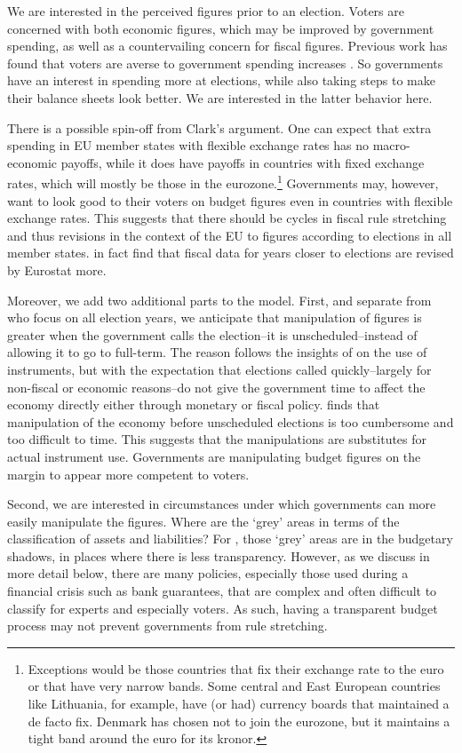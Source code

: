 \documentclass[]{article}
\begin{document}
We are interested in the perceived figures prior to an election. Voters are concerned with both economic figures, which may be improved by government spending, as well as a countervailing concern for fiscal figures. Previous work has found that voters are averse to government spending increases \citep[for a discussion see][]{deHaan2013}. So governments have an interest in spending more at elections, while also taking steps to make their balance sheets look better. We are interested in the latter behavior here.

There is a possible spin-off from Clark's argument. One can expect that extra spending in EU member states with flexible exchange rates has no macro-economic payoffs, while it does have payoffs in countries with fixed exchange rates, which will mostly be those in the eurozone.\footnote{Exceptions would be those countries that fix their exchange rate to the euro or that have very narrow bands. Some central and East European countries like Lithuania, for example, have (or had) currency boards that maintained a de facto fix. Denmark has chosen not to join the eurozone, but it maintains a tight band around the euro for its kronor.} Governments may, however, want to look good to their voters on budget figures even in countries with flexible exchange rates. This suggests that there should be cycles in fiscal rule stretching and thus revisions in the context of the EU to figures according to elections in all member states. \cite{DeCastro2013} in fact find that fiscal data for years closer to elections are revised by Eurostat more.

Moreover, we add two additional parts to the model. First, and separate from \cite{Alt2014} who focus on all election years, we anticipate that manipulation of figures is greater when the government calls the election--it is unscheduled--instead of allowing it to go to full-term. The reason follows the insights of \cite{clark2003} on the use of instruments, but with the expectation that elections called quickly--largely for non-fiscal or economic reasons--do not give the government time to affect the economy directly either through monetary or fiscal policy. \cite{Kayser2005} finds that manipulation of the economy before unscheduled elections is too cumbersome and too difficult to time. This suggests that the manipulations are substitutes for actual instrument use. Governments are manipulating budget figures on the margin to appear more competent to voters.

Second, we are interested in circumstances under which governments can more easily manipulate the figures. Where are the `grey' areas in terms of the classification of assets and liabilities? For \cite{Alt2014}, those `grey' areas are in the budgetary shadows, in places where there is less transparency. However, as we discuss in more detail below, there are many policies, especially those used during a financial crisis such as bank guarantees, that are complex and often difficult to classify for  experts and especially voters. As such, having a transparent budget process may not prevent governments from rule stretching.
\end{document}
